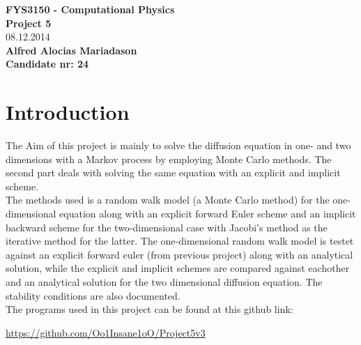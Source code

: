 \documentclass[a4paper,11pt]{article}
\newcommand{\vsp}{\vspace{0.2cm}} %
\newcommand{\secti}[1]{\centering \section{{#1}} \justifying} %
\begin{document}
\begin{titlepage}
    \begin{center}
        \vspace*{1cm}
        \textbf{\large{FYS3150 - Computational Physics}}\\
        \vspace{0.5cm}
        \textbf{Project 5}\\
        \vspace{0.3cm}
        08.12.2014\\
        \vspace{1.5cm}
        \textbf{Alfred Alocias Mariadason}\\
        \vspace{0.3cm}
        \textbf{Candidate nr: 24}\\
        \vfill
    \end{center}
\end{titlepage}
\newpage
\tableofcontents{}
\newpage

\secti{Introduction}
    The Aim of this project is mainly to solve the diffusion equation in one- and two dimensions with a Markov process by employing Monte Carlo methods. The second part deals with solving the same equation with an explicit and implicit scheme.\vsp \\
    The methods used is a random walk model (a Monte Carlo method) for the one-dimensional equation along with an explicit forward Euler scheme and an implicit backward scheme for the two-dimensional case with Jacobi's method as the iterative method for the latter. The one-dimensional random walk model is testet against an explicit forward euler (from previous project) along with an analytical solution, while the explicit and implicit schemes are compared against eachother and an analytical solution for the two dimensional diffusion equation. The stability conditions are also documented.\vsp \\
    The programs used in this project can be found at this github link:
    \begin{center}
        \url{https://github.com/Oo1Insane1oO/Project5v3}
    \end{center}
\end{document}
